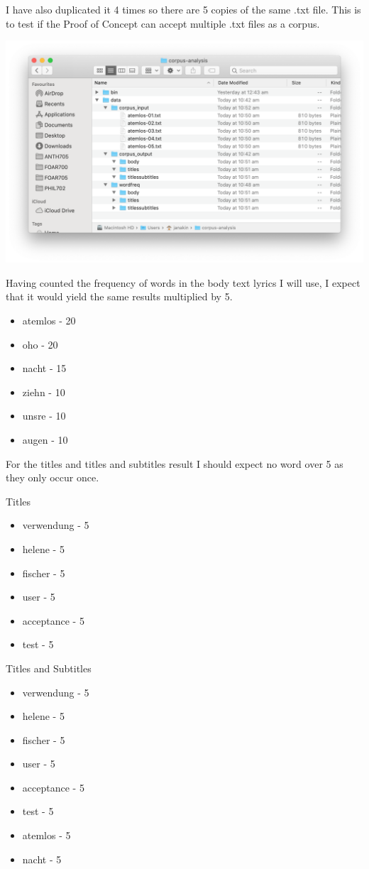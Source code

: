 \documentclass{article}
\begin{document}
I have also duplicated it 4 times so there are 5 copies of the same .txt file. This is to test if the Proof of Concept can accept multiple .txt files as a corpus.

\includegraphics[width=\textwidth]{uat02.png}

Having counted the frequency of words in the body text lyrics I will use, I expect that it would yield the same results multiplied by 5.

\begin{itemize}
    \item atemlos - 20
    \item oho - 20
    \item nacht - 15
    \item ziehn - 10
    \item unsre - 10
    \item augen - 10
\end{itemize}

For the titles and titles and subtitles result I should expect no word over 5 as they only occur once.

Titles
\begin{itemize}
    \item verwendung - 5
    \item helene - 5
    \item fischer - 5
    \item user - 5
    \item acceptance - 5
    \item test - 5
\end{itemize}

Titles and Subtitles
\begin{itemize}
    \item verwendung - 5
    \item helene - 5
    \item fischer - 5
    \item user - 5
    \item acceptance - 5
    \item test - 5
    \item atemlos - 5
    \item nacht - 5
\end{itemize}
\end{document}
